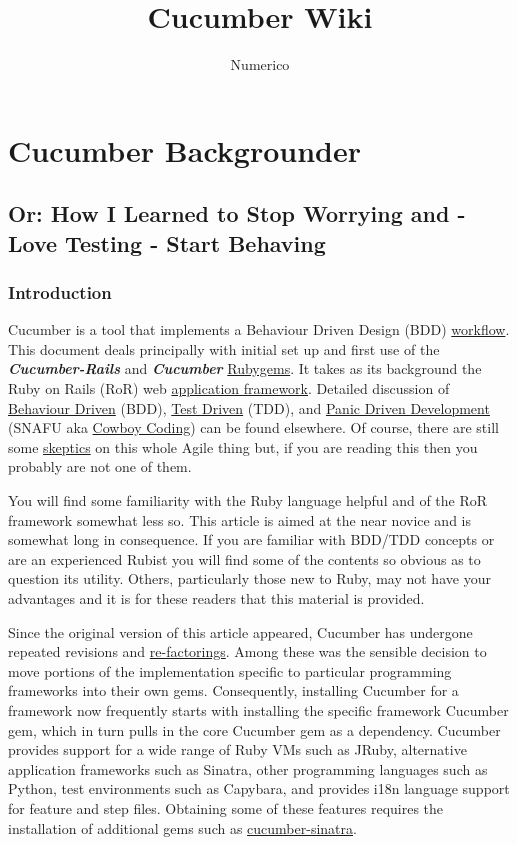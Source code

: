 \documentclass[10pt]{book}
\title{Cucumber Wiki}
\author{Numerico}
\begin{document}
\tableofcontents

\chapter{Cucumber Backgrounder}

\section{Or: How I Learned to Stop Worrying and - Love Testing - Start Behaving}

\subsection{Introduction}

Cucumber is a tool that implements a Behaviour Driven Design (BDD) \href{http://en.wikipedia.org/wiki/Workflow}{workflow}.  This document deals principally with initial set up and first use of the \textbf{\emph{ Cucumber-Rails}} and \textbf{\emph{Cucumber}} \href{http://en.wikipedia.org/wiki/RubyGems}{Rubygems}. It takes as its background the Ruby on Rails (RoR) web \href{http://en.wikipedia.org/wiki/Framework}{application framework}.  Detailed discussion of \href{http://en.wikipedia.org/wiki/Behavior_driven_development}{Behaviour Driven} (BDD), \href{http://en.wikipedia.org/wiki/Test-driven_development}{Test Driven} (TDD), and \href{http://en.wikipedia.org/wiki/SNAFU}{Panic Driven Development} (SNAFU aka \href{http://cowboyprogramming.com/2007/01/11/delving-into-cowboy-programming/}{Cowboy Coding}) can be found elsewhere.  Of course, there are still some \href{http://steve-yegge.blogspot.ca/2006/09/good-agile-bad-agile_27.html}{skeptics} on this whole Agile thing but, if you are reading this then you probably are not one of them.

You will find some familiarity with the Ruby language helpful and of the RoR framework somewhat less so.  This article is aimed at the near novice and is somewhat long in consequence.  If you are familiar with BDD/TDD concepts or are an experienced Rubist you will find some of the contents so obvious as to question its utility.  Others, particularly those new to Ruby, may not have your advantages and it is for these readers that this material is provided.

Since the original version of this article appeared, Cucumber has undergone repeated revisions and \href{http://en.wikipedia.org/wiki/Code_refactoring}{re-factorings}.  Among these was the sensible decision to move portions of the implementation specific to particular programming frameworks into their own gems.  Consequently, installing Cucumber for a framework now frequently starts with installing the specific framework Cucumber gem, which in turn pulls in the core Cucumber gem as a dependency.  Cucumber provides support for a wide range of Ruby VMs such as JRuby, alternative application frameworks such as Sinatra, other programming languages such as Python, test environments such as Capybara, and provides i18n language support for feature and step files.  Obtaining some of these features requires the installation of additional gems such as \href{http://rubygems.org/gems/cucumber-sinatra}{cucumber-sinatra}.
\end{document}

